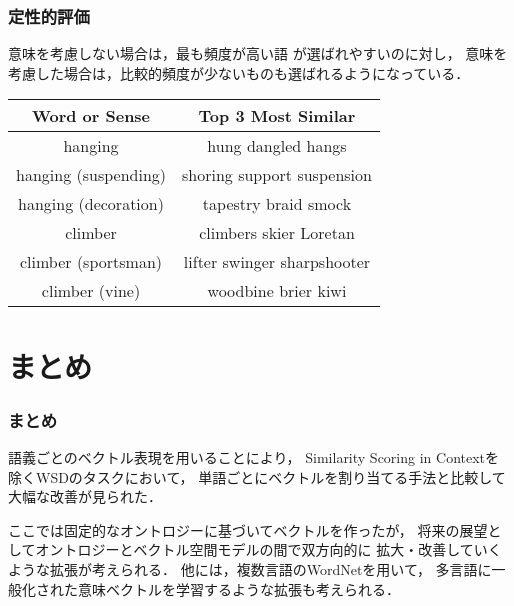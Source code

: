 \documentclass[10pt,usepdftitle=false,hyperref={unicode}]{beamer}
\begin{document}
\begin{frame}
\frametitle{定性的評価}
意味を考慮しない場合は，最も頻度が高い語
が選ばれやすいのに対し，
意味を考慮した場合は，比較的頻度が少ないものも選ばれるようになっている．

\bigskip

        \begin{center}
            \begin{algfont}
                {\renewcommand{\arraystretch}{1.5}
                    {\footnotesize
                        \begin{tabular}{|c|c|}
                        \hline
                        Word or Sense        & Top 3 Most Similar          \\
                        \hline
                        hanging              & hung dangled hangs          \\
                        hanging (suspending) & shoring support suspension  \\
                        hanging (decoration) & tapestry braid smock        \\
                        \hline
                        climber              & climbers skier Loretan      \\
                        climber (sportsman)  & lifter swinger sharpshooter \\
                        climber (vine)      & woodbine brier kiwi \\
                        \hline
                        \end{tabular}
                    }
                }
            \end{algfont}
        \end{center}
\end{frame}

\section{まとめ}
\begin{frame}
\frametitle{まとめ}
語義ごとのベクトル表現を用いることにより，
Similarity Scoring in Contextを除くWSDのタスクにおいて，
単語ごとにベクトルを割り当てる手法と比較して大幅な改善が見られた．

\bigskip

ここでは固定的なオントロジーに基づいてベクトルを作ったが，
将来の展望としてオントロジーとベクトル空間モデルの間で双方向的に
拡大・改善していくような拡張が考えられる．
他には，複数言語のWordNetを用いて，
多言語に一般化された意味ベクトルを学習するような拡張も考えられる．
\end{frame}
\end{document}
